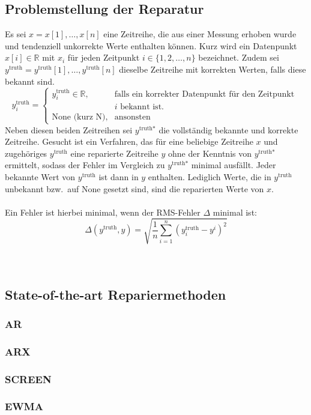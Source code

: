 \subsection{Problemstellung der Reparatur}

Es sei $x = x[1],\dots,x[n]$ eine Zeitreihe, die aus einer Messung erhoben
wurde und tendenziell unkorrekte Werte enthalten können. Kurz wird ein
Datenpunkt $x[i] \in \mathbb{R}$ mit $x_i$ für jeden Zeitpunkt $i \in \{1,2,\dots,n\}$
bezeichnet. Zudem sei $y^{\text{truth}} =
y^{\text{truth}}[1],\dots,y^{\text{truth}}[n]$ dieselbe Zeitreihe mit korrekten
Werten, falls diese bekannt sind.
\[
    y^{\text{truth}}_i = \left\{
\begin{array}{ll}
y^{\text{truth}}_i \in \mathbb{R},& \text{falls ein korrekter Datenpunkt für den Zeitpunkt }\\
& i \text{ bekannt ist.}\\
    \text{None (kurz N)},& \text{ansonsten}
\end{array}
 \right.
\]
Neben diesen beiden Zeitreihen sei $y^{\text{truth*}}$ die vollständig bekannte
und korrekte Zeitreihe. Gesucht ist ein Verfahren, das für eine beliebige
Zeitreihe $x$ und zugehöriges $y^{\text{truth}}$ eine reparierte Zeitreihe $y$ ohne der Kenntnis von $y^{\text{truth*}}$ ermittelt,
sodass der Fehler im Vergleich zu $y^{\text{truth*}}$ minimal ausfällt. Jeder
bekannte Wert von $y^{\text{truth}}$ ist dann in $y$ enthalten. Lediglich
Werte, die in $y^{\text{truth}}$ unbekannt bzw.\ auf None gesetzt sind, sind die
reparierten Werte von $x$.
\\
\\
Ein Fehler ist hierbei minimal, wenn der RMS-Fehler $\Delta$ minimal ist:
\[
    \Delta\left(y^{\text{truth}}, y\right) = \sqrt{\frac{1}{n} \sum_{i=1}^n \left( y_i^{\text{truth}} - y^i \right)^2}
\]
~\\
\\
\subsection{State-of-the-art Repariermethoden}
\subsubsection{AR}
\subsubsection{ARX}
\subsubsection{SCREEN}
\subsubsection{EWMA}

